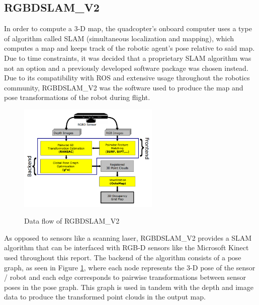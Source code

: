 \documentclass[letterpaper, oneside, 10pt]{report}
\begin{document}
\subsection{RGBDSLAM\_V2}
\noindent In order to compute a 3-D map, the quadcopter's onboard computer uses a type of algorithm called SLAM (simultaneous localization and mapping), which computes a map and keeps track of the robotic agent's pose relative to said map. Due to time constraints, it was decided that a proprietary SLAM algorithm was not an option and a previously developed software package was chosen instead. Due to its compatibility with ROS and extensive usage throughout the robotics community, RGBDSLAM\_V2 \cite{endres2012evaluation} was the software used to produce the map and pose transformations of the robot during flight.

\begin{figure}[h!]
 \caption{Data flow of RGBDSLAM\_V2 \cite{endres2012evaluation}}
 \centering
   \includegraphics[width=0.6\textwidth]{images/rgbdslam}
 \label{fig: rgbdslam.}
\end{figure}

As opposed to sensors like a scanning laser, RGBDSLAM\_V2 provides a SLAM algorithm that can be interfaced with RGB-D sensors like the Microsoft Kinect used throughout this report. The backend of the algorithm consists of a pose graph, as seen in Figure \ref{fig: rgbdslam.}, where each node represents the 3-D pose of the sensor / robot and each edge corresponds to pairwise transformations between sensor poses in the pose graph. This graph is used in tandem with the depth and image data to produce the transformed point clouds in the output map.
\end{document}
